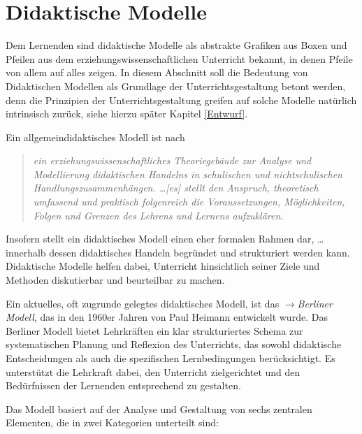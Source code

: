 \chapter{Didaktische Modelle}\label{DidMod}

Dem Lernenden sind didaktische Modelle als abstrakte Grafiken aus Boxen und Pfeilen aus dem erziehungswissenschaftlichen Unterricht bekannt, in denen Pfeile von allem auf alles zeigen. In diesem Abschnitt soll die Bedeutung von Didaktischen Modellen als Grundlage der Unterrichtsgestaltung betont werden, denn die Prinzipien der Unterrichtsgestaltung greifen auf solche Modelle nat\"{u}rlich intrinsisch zur\"{u}ck, siehe hierzu sp\"{a}ter Kapitel \ref{Entwurf}.

\mip

Ein allgemeindidaktisches Modell ist nach \textcite{JankMeyer} \begin{quote}{\glqq}\emph{ein erziehungswissenschaftliches Theoriegeb\"{a}ude zur Analyse und Modellierung didaktischen Handelns in schulischen und nichtschulischen Handlungszusammenh\"{a}ngen. \dots [es] stellt den Anspruch, theoretisch umfassend und praktisch folgenreich die Voraussetzungen, M\"{o}glichkeiten, Folgen und Grenzen des Lehrens und Lernens aufzukl\"{a}ren.}{\grqq} \end{quote} Insofern stellt ein didaktisches Modell einen eher formalen Rahmen dar, {\glqq}\dots innerhalb dessen didaktisches Handeln begr\"{u}ndet und strukturiert werden kann.{\grqq} Didaktische Modelle helfen dabei, Unterricht hinsichtlich seiner Ziele und Methoden diskutierbar und beurteilbar zu machen.

\mip

Ein aktuelles, oft zugrunde gelegtes didaktisches Modell, ist das  $\to$\emph{Berliner Modell}, das in den 1960er Jahren von Paul Heimann entwickelt wurde.  Das Berliner Modell bietet Lehrkr\"{a}ften ein klar strukturiertes Schema zur systematischen Planung und Reflexion des Unterrichts, das sowohl didaktische Entscheidungen als auch die spezifischen Lernbedingungen ber\"{u}cksichtigt. Es unterst\"{u}tzt die Lehrkraft dabei, den Unterricht zielgerichtet und den Bed\"{u}rfnissen der Lernenden entsprechend zu gestalten.

\mip

Das Modell basiert auf der Analyse und Gestaltung von sechs zentralen Elementen, die in zwei Kategorien unterteilt sind:

